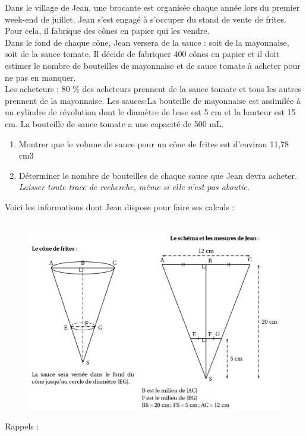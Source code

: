 \documentclass[11pt]{article}
\begin{document}
\begin{multicols}{2}

  Dans le village de Jean, une brocante est organisée chaque année lors du premier week-end de juillet. Jean s’est engagé à s’occuper du stand de vente de frites. Pour cela, il fabrique des cônes en papier qui les vendre. \\
  Dans le fond de chaque cône, Jean versera de la sauce : soit de la mayonnaise, soit de la sauce tomate. 
  Il décide de fabriquer 400 cônes en papier et il doit estimer le nombre de bouteilles de mayonnaise et de sauce tomate à acheter pour ne pas en manquer. \\

  Les acheteurs : 80 \% des acheteurs prennent de la sauce tomate et tous les autres prennent de la mayonnaise. Les sauces:La bouteille de mayonnaise est assimilée à un cylindre de révolution dont le diamètre de base est 5 cm et la hauteur est 15 cm. La bouteille de sauce tomate a une capacité de 500 mL.

  \begin{enumerate}
  \item Montrer que le volume de sauce pour un cône de frites est d’environ 11,78 cm3
  \item Déterminer le nombre de bouteilles de chaque sauce que Jean devra acheter. \\
    \textit{Laisser toute trace de recherche, même si elle n’est pas aboutie.} \\
  \end{enumerate}

  Voici les informations dont Jean dispose pour faire ses calculs :

  \begin{figure}[H]
        \centering
        \includegraphics[width=\linewidth]{3x3-volumes-1/sources/sauce.png}
  \end{figure}
  Rappels : 


\end{multicols}
\end{document}
